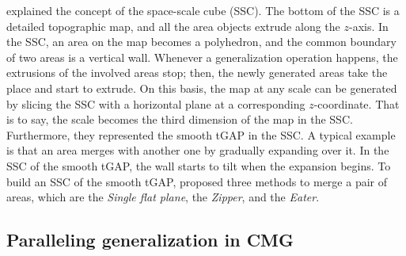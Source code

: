\documentclass{ica}
\begin{document}
explained the concept of the space-scale cube (SSC).
The bottom of the SSC is a detailed topographic map,
and all the area objects extrude along the $z$-axis.
In the SSC, an area on the map becomes a polyhedron, and
the common boundary of two areas is a vertical wall.
Whenever a generalization operation happens, 
the extrusions of the involved areas stop;
then, the newly generated areas take the place and start to extrude.
On this basis, the map at any scale can be generated by slicing the SSC 
with a horizontal plane at a corresponding $z$-coordinate.
That is to say, the scale becomes the third dimension of the map in the SSC.
Furthermore, they represented the smooth tGAP in the SSC.
A typical example is that 
an area merges with another one by gradually expanding over it.
In the SSC of the smooth tGAP, 
the wall starts to tilt when the expansion begins.
To build an SSC of the smooth tGAP, 
\citet{Suba2014Merge} proposed three methods 
to merge a pair of areas, 
which are the \emph{Single flat plane}, 
the \emph{Zipper}, and the \emph{Eater}.








\subsection{Paralleling generalization in CMG}
\end{document}
